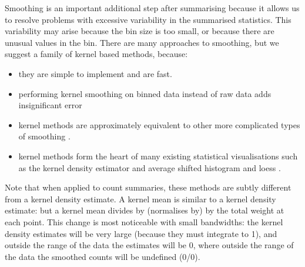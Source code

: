 \documentclass[journal]{vgtc}                %
\begin{document}
Smoothing is an important additional step after summarising because it allows us to resolve problems with excessive variability in the summarised statistics. This variability may arise because the bin size is too small, or because there are unusual values in the bin. There are many approaches to smoothing, but we suggest a family of kernel based methods, because:

\begin{itemize}
  \item they are simple to implement and are fast.
  
  \item performing kernel smoothing on binned data instead of raw data adds insignificant error \cite{wand:1994} 
  
  \item kernel methods are approximately equivalent to other more complicated types of smoothing \citep{silverman:1984}.
  
  \item kernel methods form the heart of many existing statistical visualisations such as the kernel density estimator \citep{scott:1992} and average shifted histogram \citep{scott:1985} and loess \citep{cleveland:1979}.

\end{itemize}

Note that when applied to count summaries, these methods are subtly different from a kernel density estimate. A kernel mean is similar to a kernel density estimate: but a kernel mean divides by (normalises by) by the total weight at each point. This change is most noticeable with small bandwidths: the kernel density estimates will be very large (because they must integrate to 1), and outside the range of the data the estimates will be 0, where outside the range of the data the smoothed counts will be undefined (0/0).
\end{document}
